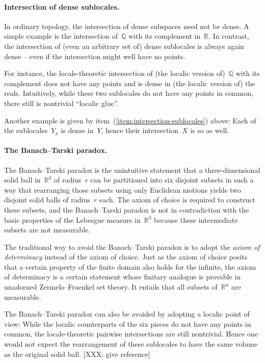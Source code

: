 \documentclass{ws-rv9x6}
\newcommand{\QQ}{\mathbb{Q}}
\newcommand{\RR}{\mathbb{R}}
\renewcommand{\_}{\mathpunct{.}}
\newcommand{\?}{\,{:}\,}
\begin{document}
\paragraph{Intersection of dense sublocales.} In ordinary topology, the
intersection of dense subspaces need not be dense. A simple example is the
intersection of~$\QQ$ with its complement in~$\RR$. In contrast, the
intersection of (even an arbitrary set of) dense sublocales is always again
dense -- even if the intersection might well have no points.

For instance, the locale-theoretic intersection of (the localic version
of)~$\QQ$ with its complement does not have any points and is dense in (the
localic version of) the reals. Intuitively, while these two sublocales do not
have any points in common, there still is nontrivial ``localic glue''.


Another example is given by item~(\ref{item:intersection-sublocales}) above:
Each of the sublocales~$Y_x$ is dense in~$Y$, hence their intersection~$X$ is
so as well.


\paragraph{The Banach--Tarski paradox.} The Banach--Tarski paradox is the
unintuitive statement that a three-dimensional solid ball in~$\RR^3$ of
radius~$r$ can be partitioned into six disjoint subsets in such a way that
rearranging those subsets using only Euclidean motions yields two disjoint
solid balls of radius~$r$ each. The axiom of choice is required to construct
these subsets, and the Banach--Tarski paradox is not in
contradiction with the basic properties of the Lebesgue measure in~$\RR^3$
because these intermediate subsets are not measurable.

The traditional way to avoid the Banach--Tarski paradox is to adopt the
\emph{axiom of determinacy} instead of the axiom of choice. Just as the axiom
of choice posits that a certain property of the finite domain also holds for the
infinite, the axiom of determinacy is a certain statement whose finitary
analogue is provable in unadorned Zermelo--Fraenkel set theory. It entails that
all subsets of~$\RR^n$ are measurable.

The Banach--Tarski paradox can also be avoided by adopting a localic point of
view: While the localic counterparts of the six pieces do not have any points
in common, the locale-theoretic pairwise intersections are still nontrivial.
Hence one would not expect the rearrangement of these sublocales to have the
same volume as the original solid ball. [XXX: give reference]
\end{document}
